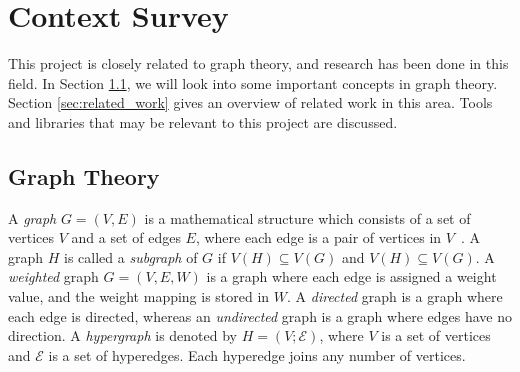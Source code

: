 \documentclass[12pt,a4paper]{report}
\begin{document}
\chapter{Context Survey}\label{chapter:context}
This project is closely related to graph theory, and research has been done in this field. In Section \ref{sec:graph_theory}, we will look into some important concepts in graph theory. Section \ref{sec:related_work} gives an overview of related work in this area. Tools and libraries that may be relevant to this project are discussed.

\section{Graph Theory} \label{sec:graph_theory}
A \textit{graph} $G=(V,E)$ is a mathematical structure which consists of a set of vertices $V$ and a set of edges $E$, where each edge is a pair of vertices in $V$~\cite{chartrand}. A graph $H$ is called a \textit{subgraph} of $G$ if $V(H) \subseteq V(G)$ and $V(H) \subseteq V(G)$. A \textit{weighted} graph $G=(V,E,W)$ is a graph where each edge is assigned a weight value, and the weight mapping is stored in $W$. A \textit{directed} graph is a graph where each edge is directed, whereas an \textit{undirected} graph is a graph where edges have no direction. A \textit{hypergraph} is denoted by $H=(V;\mathcal{E})$, where $V$ is a set of vertices and $\mathcal{E}$ is a set of hyperedges. Each hyperedge joins any number of vertices.
\end{document}
